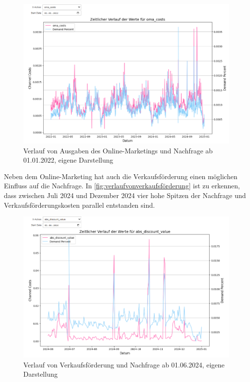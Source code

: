 \begin{figure}[H]
    \centering
    \includegraphics[width=1\linewidth]{images/omacosts.png}
    \caption{Verlauf von Ausgaben des Online-Marketings und Nachfrage ab 01.01.2022, eigene Darstellung}
    \label{fig:omaverlauf}
\end{figure}
\noindent
Neben dem Online-Marketing hat auch die Verkaufsförderung einen möglichen Einfluss auf die Nachfrage. In \autoref{fig:verlaufvonverkaufsförderung} ist zu erkennen, dass zwischen Juli 2024 und Dezember 2024 vier hohe Spitzen der Nachfrage und Verkaufsförderungskosten parallel entstanden sind. 
\begin{figure}[H]
    \centering
    \includegraphics[width=1\linewidth]{images/vf_sum.png}
    \caption{Verlauf von Verkaufsförderung und Nachfrage ab 01.06.2024, eigene Darstellung}
    \label{fig:verlaufvonverkaufsförderung}
\end{figure}
